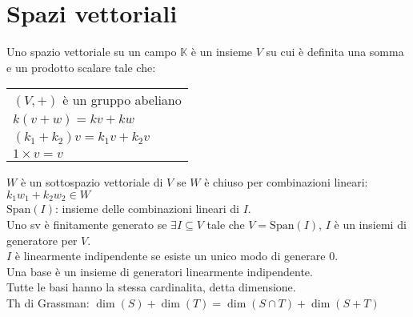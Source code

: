 \section{Spazi vettoriali}
Uno spazio vettoriale su un campo $\mathbb{K}$ è un insieme $V$ su cui è definita una somma e un prodotto scalare tale che:
\begin{tabular}{l}
    $(V,+)$ è un gruppo abeliano \\
    $k(v+w) = kv+kw$ \\
    $(k_1+k_2)v = k_1v+k_2v$ \\
    $1 \times v = v$ \\
\end{tabular}

$W$ è un sottospazio vettoriale di $V$ se $W$ è chiuso per combinazioni lineari: $k_1w_1 + k_2w_2 \in W$ \\
$\text{Span}(I)$: insieme delle combinazioni lineari di $I$. \\
Uno sv è finitamente generato se $\exists I \subseteq V$ tale che $V=\text{Span}(I)$, $I$ è un insiemi di generatore per $V$. \\
$I$ è linearmente indipendente se esiste un unico modo di generare $0$. \\
Una base è un insieme di generatori linearmente indipendente. \\
Tutte le basi hanno la stessa cardinalita, detta dimensione. \\ 
Th di Grassman: $\dim (S) + \dim (T) = \dim (S \cap T) + \dim (S+T)$ \\

